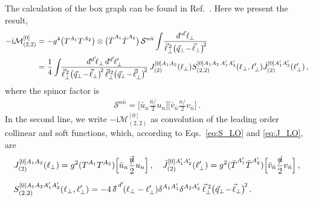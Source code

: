 \documentclass[letterpaper,11pt]{article}
\def\cS{\mathcal{S}}
\newcommand{\eqs}[2]{Eqs.~\eqref{eq:#1} and \eqref{eq:#2}}
\newcommand{\img}{\mathrm{i}}
\newcommand{\cM}{\mathcal{M}}
\newcommand{\ddslash}{{d\!\!{}^-}}
\newcommand{\deltaslash}{{\delta\!\!\!{}^-}}
\newcommand{\nn}{\nonumber}
\newcommand\prp[1]{\vec #1_\perp}
\newcommand\prpsqm[2]{\bigl( \prp{#1} \!-\! \prp{#2} \bigr)^{\!2}}
\newcommand{\bn}{{\bar n}}
\newcommand{\bT}{{\bar T}}
\def\bnslash{\bar n\!\!\!\slash}
\def\nslash{n\!\!\!\slash}
\newcommand{\dbar}{d\hspace*{-0.08em}\bar{}\hspace*{0.1em}}
\begin{document}
The calculation of the box graph can be found in Ref.~\cite{Rothstein:2016bsq}. Here we present the result,
\begin{align}  \label{eq:Gboxes0}
-\img\cM_{(2,2)}^{[0]} &= - g^4 \bigl(T^{A_1} T^{A_2}\bigr) \otimes \bigl(\bT^{A_1} \bT^{A_2}\bigr)\, \cS^{n\bn}  \int\! \frac{\ddslash\!^{d'}\!\ell_\perp}{\vec\ell_\perp^{\,2} \prpsqm{q}{\ell}}
\\
&= \frac{1}{4} \int\!\! \frac{\dbar^{d'}\!\ell_\perp\, \dbar^{d'}\!\ell'_{\perp}}{\vec\ell_\perp^{\,2} \prpsqm{q}{\ell}\, \vec\ell^{\prime2}_\perp \prpsqm{q}{\ell'}} \,
J_{(2)}^{[0]A_1 A_2}(\ell_\perp)  S_{(2,2)}^{[0]A_1 A_2\, A_1' A_2'}(\ell_{\perp}, \ell^{\prime}_{\perp} ) \bar J_{(2)}^{[0] A_1'A_2'}(\ell_\perp^{\prime})  \,, \nn
\end{align}
where 
%
the spinor factor is
%
\begin{align} \label{eq:Snbn}
   \cS^{n\bn} = \Big[ \bar u_n  \frac{\bnslash}{2} u_n \Big]\Big[ \bar v_\bn  \frac{\nslash}{2} v_\bn \Big] \,.
\end{align} 
%
In the second line, we write $-\img\cM_{(2,2)}^{[0]}$ as convolution of the leading order collinear and soft functions, which, according to \eqs{S_LO}{J_LO}, are 
\begin{align}
  & J_{(2)}^{[0]A_1 A_2}(\ell_\perp) = g^2 (T^{A_1} T^{A_2}) \Bigl[\bar u_n  \frac{\bnslash}{2} u_n \Bigr]
  \,,\quad
  \bar J_{(2)}^{[0]A_1'A_2'}(\ell_\perp^{\prime}) = g^2 (\bT^{A_1'} \bT^{A_2'}) \Bigl[ \bar v_\bn  \frac{\nslash}{2} v_\bn \Bigr]\,,\\[.2cm]
  & S_{(2,2)}^{[0]A_1 A_2 A_1'A_2'}(\ell_\perp, \ell_\perp^{\prime}) = -4\, \deltaslash^{d'}\!(\ell_\perp-\ell_\perp^{\prime}) \delta^{A_1 A_1'}\delta^{A_2A_2'}\,\vec\ell_\perp^{\;2} \prpsqm{q}{\ell}\,.
\end{align}
\end{document}
